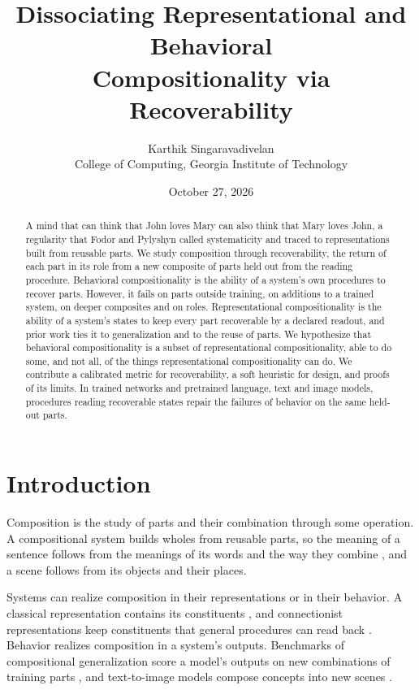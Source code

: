 \documentclass[10pt]{article}
\title{Dissociating Representational and Behavioral\\ Compositionality via Recoverability}
\author{Karthik Singaravadivelan\\ College of Computing, Georgia Institute of Technology}
\date{October 27, 2026}
\theoremstyle{plain}
\theoremstyle{remark}
\begin{document}
\maketitle

\begin{abstract}
A mind that can think that John loves Mary can also think that Mary loves John, a regularity that Fodor and Pylyshyn called systematicity and traced to representations built from reusable parts. We study composition through recoverability, the return of each part in its role from a new composite of parts held out from the reading procedure. Behavioral compositionality is the ability of a system's own procedures to recover parts. However, it fails on parts outside training, on additions to a trained system, on deeper composites and on roles. Representational compositionality is the ability of a system's states to keep every part recoverable by a declared readout, and prior work ties it to generalization and to the reuse of parts. We hypothesize that behavioral compositionality is a subset of representational compositionality, able to do some, and not all, of the things representational compositionality can do. We contribute a calibrated metric for recoverability, a soft heuristic for design, and proofs of its limits. In trained networks and pretrained language, text and image models, procedures reading recoverable states repair the failures of behavior on the same held-out parts.
\end{abstract}

\section{Introduction}
\label{sec:intro}

Composition is the study of parts and their combination through some operation. A compositional system builds wholes from reusable parts, so the meaning of a sentence follows from the meanings of its words and the way they combine \citep{frege1923,janssen1997}, and a scene follows from its objects and their places.

Systems can realize composition in their representations or in their behavior. A classical representation contains its constituents \citep{fodor1988}, and connectionist representations keep constituents that general procedures can read back \citep{hinton1990,smolensky1990,vangelder1990}. Behavior realizes composition in a system's outputs. Benchmarks of compositional generalization score a model's outputs on new combinations of training parts \citep{lake2018,keysers2020,hupkes2020}, and text-to-image models compose concepts into new scenes \citep{ramesh2021}.
\end{document}
